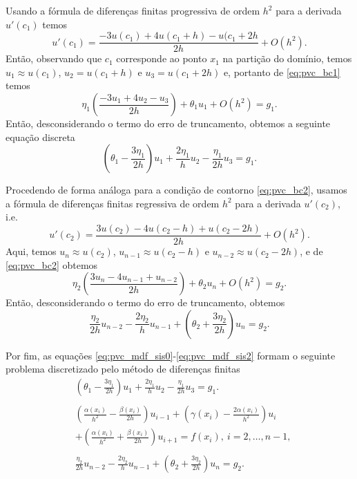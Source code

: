Usando a fórmula de diferenças finitas progressiva de ordem $h^2$ para a derivada $u'(c_1)$ temos
\begin{equation}
  u'(c_1) = \frac{-3u(c_1) + 4u(c_1+h) - u(c_1+2h}{2h} + O(h^2).
\end{equation}
Então, observando que $c_1$ corresponde ao ponto $x_1$ na partição do domínio, temos $u_1 \approx u(c_1)$, $u_2 = u(c_1+h)$ e $u_3 = u(c_1+2h)$ e, portanto de \eqref{eq:pvc_bc1} temos
\begin{equation}
  \eta_1\left(\frac{-3u_1 + 4u_2 - u_3}{2h}\right) + \theta_1u_1 + O(h^2) = g_1.
\end{equation}
Então, desconsiderando o termo do erro de truncamento, obtemos a seguinte equação discreta
\begin{equation}
  \left(\theta_1 - \frac{3\eta_1}{2h}\right)u_1 + \frac{2\eta_1}{h}u_2 - \frac{\eta_1}{2h}u_3 = g_1.\label{eq:pvc_mdf_sis0}
\end{equation}

Procedendo de forma análoga para a condição de contorno \eqref{eq:pvc_bc2}, usamos a fórmula de diferenças finitas regressiva de ordem $h^2$ para a derivada $u'(c_2)$, i.e.
\begin{equation}
  u'(c_2) = \frac{3u(c_2) - 4u(c_2-h)+u(c_2-2h)}{2h} + O(h^2).
\end{equation}
Aqui, temos $u_{n}\approx u(c_2)$, $u_{n-1}\approx u(c_2-h)$ e $u_{n-2}\approx u(c_2-2h)$, e de \eqref{eq:pvc_bc2} obtemos
\begin{equation}
  \eta_2\left(\frac{3u_n - 4u_{n-1} + u_{n-2}}{2h}\right) + \theta_2u_n + O(h^2) = g_2.
\end{equation}
Então, desconsiderando o termo do erro de truncamento, obtemos
\begin{equation}
  \frac{\eta_2}{2h}u_{n-2} - \frac{2\eta_2}{h}u_{n-1} + \left(\theta_2 + \frac{3\eta_2}{2h}\right)u_n = g_2.\label{eq:pvc_mdf_sis2}
\end{equation}

Por fim, as equações \eqref{eq:pvc_mdf_sis0}-\eqref{eq:pvc_mdf_sis2} formam o seguinte problema discretizado pelo método de diferenças finitas
\begin{align}
  &\left(\theta_1 - \frac{3\eta_1}{2h}\right)u_1 + \frac{2\eta_1}{h}u_2 - \frac{\eta_1}{2h}u_3 = g_1.\label{eq:pvc_mdf_bc1}\\
  &~\nonumber\\
  &\left(\frac{\alpha(x_i)}{h^2}-\frac{\beta(x_i)}{2h}\right)u_{i-1} + \left(\gamma(x_i) - \frac{2\alpha(x_i)}{h^2}\right)u_i \nonumber \\
  &+ \left(\frac{\alpha(x_i)}{h^2}+\frac{\beta(x_i)}{2h}\right)u_{i+1} = f(x_i),~i=2, \dotsc, n-1, \label{eq:pvc_mdf_eq}\\
  &~\nonumber\\
  &\frac{\eta_2}{2h}u_{n-2} - \frac{2\eta_2}{h}u_{n-1} + \left(\theta_2 + \frac{3\eta_2}{2h}\right)u_n = g_2.\label{eq:pvc_mdf_bc2}
\end{align}

